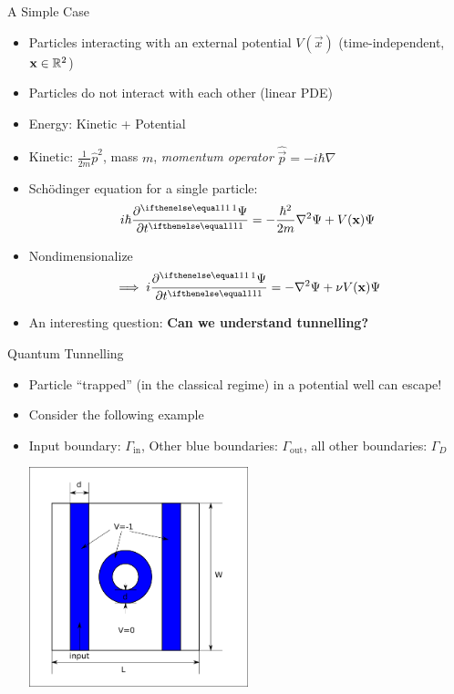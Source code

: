 \documentclass{beamer}
\begin{document}
\begin{frame}{A Simple Case}
  \begin{itemize}
  	\item Particles interacting with an external potential 
			$V(\vec x)$ (time-independent, $\mathbf{x} \in \mathbb{R}^2$)
	\item Particles do not interact with each other (linear PDE)
	\item Energy: Kinetic + Potential
	\item Kinetic: $\frac{1}{2m} \hat p^2$, mass $m$, 
			\textit{momentum operator} $\hat{\vec p} = -i \hbar \nabla$
	\item Sch\"odinger equation for a single particle:
			\[
					i \hbar \pder{\Psi}{t} = 
					-\frac{\hbar^2}{2m} \nabla^2 \Psi + V(\vec x) \Psi
			\]
	\item Nondimensionalize 
			\[
					\implies i \pder{\Psi}{t} = 
					-\nabla^2 \Psi + \nu V(\vec x) \Psi
			\] 
	\item An interesting question: \textbf{Can we understand tunnelling?}
  \end{itemize}
\end{frame}

\begin{frame}{Quantum Tunnelling}
  \begin{itemize}
	\item Particle ``trapped'' (in the classical regime) in a potential
			well can escape!
	\item Consider the following example 
	\item Input boundary: $\Gamma_\mathrm{in}$, 
			Other blue boundaries: $\Gamma_\mathrm{out}$,
			all other boundaries: $\Gamma_D$

  \begin{center}
  \includegraphics[width=0.5\textwidth]
  {../writeup/sections/intro/system-sketch.png}
  \end{center}

  \end{itemize}
\end{frame}
\end{document}
